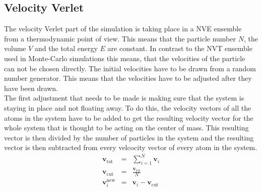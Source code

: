 \documentclass[12pt]{article}
\begin{document}
\subsection{Velocity Verlet}
The velocity Verlet part of the simulation is taking place in a NVE ensemble from a thermodynamic point of view. 
This means that the particle number $N$, the volume $V$ and the
total energy $E$ are constant. In contrast to the NVT ensemble used in Monte-Carlo simulations this means, that the velocities of the particle can not
be chosen directly. The initial velocities have to be drawn from a random number generator. This means that the velocities have to be adjusted after 
they have been drawn.\\
The first adjustment that needs to be made is making sure that the system is staying in place and not floating away. To do this, the velocity vectors
of all the atoms in the system have to be added to get the resulting velocity vector for the whole system that is thought to be acting on the center
of mass. This resulting vector is then divided by the number of particles in the system and the resulting vector is then subtracted from every
velcocity vector of every atom in the system. 
\begin{eqnarray}
    \mathbf{v}_\text{tot} &=& \sum_{i=1}^N \mathbf{v}_i\\
    \mathbf{v}_\text{cut} &=& \frac{\mathbf{v}_\text{tot}}N\\
    \mathbf{v}_i^\text{new} &=& \mathbf{v}_i - \mathbf{v}_\text{cut}
\end{eqnarray}
\end{document}
